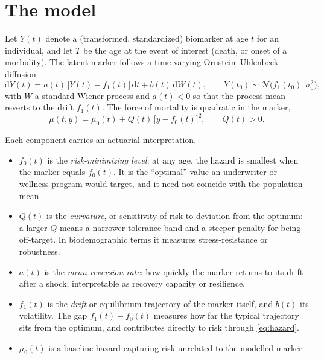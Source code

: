 \documentclass[review,3p,times]{elsarticle}
\newcommand{\dd}{\mathrm{d}}
\newcommand{\fzero}{f_0}
\newcommand{\fone}{f_1}
\begin{document}
\section{The model}\label{sec:model}

Let $Y(t)$ denote a (transformed, standardized) biomarker at age $t$ for an
individual, and let $T$ be the age at the event of interest (death, or onset of a
morbidity). The latent marker follows a time-varying Ornstein--Uhlenbeck diffusion
\begin{equation}\label{eq:sde}
  \dd Y(t) = a(t)\,\bigl[Y(t)-\fone(t)\bigr]\,\dd t + b(t)\,\dd W(t),
  \qquad Y(t_0)\sim \mathcal{N}\!\bigl(\fone(t_0),\sigma_0^2\bigr),
\end{equation}
with $W$ a standard Wiener process and $a(t)<0$ so that the process mean-reverts to
the drift $\fone(t)$. The force of mortality is quadratic in the marker,
\begin{equation}\label{eq:hazard}
  \mu(t,y) = \mu_0(t) + Q(t)\,\bigl[y-\fzero(t)\bigr]^2,
  \qquad Q(t)>0 .
\end{equation}

Each component carries an actuarial interpretation.
\begin{itemize}
\item $\fzero(t)$ is the \emph{risk-minimizing level}: at any age, the hazard is
smallest when the marker equals $\fzero(t)$. It is the ``optimal'' value an
underwriter or wellness program would target, and it need not coincide with the
population mean.
\item $Q(t)$ is the \emph{curvature}, or sensitivity of risk to deviation from the
optimum: a larger $Q$ means a narrower tolerance band and a steeper penalty for
being off-target. In biodemographic terms it measures stress-resistance or
robustness.
\item $a(t)$ is the \emph{mean-reversion rate}: how quickly the marker returns to
its drift after a shock, interpretable as recovery capacity or resilience.
\item $\fone(t)$ is the \emph{drift} or equilibrium trajectory of the marker
itself, and $b(t)$ its volatility. The gap $\fone(t)-\fzero(t)$ measures how far
the typical trajectory sits from the optimum, and contributes directly to risk
through \eqref{eq:hazard}.
\item $\mu_0(t)$ is a baseline hazard capturing risk unrelated to the modelled
marker.
\end{itemize}
\end{document}
